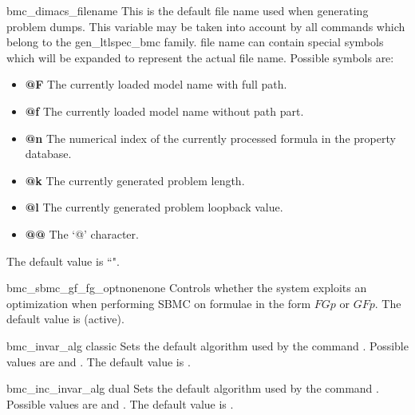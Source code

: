 \begin{nusmvVar} {bmc\_dimacs\_filename}{}{}
This is the default file name used when generating \dimacs problem
dumps. This variable may be taken into account by all commands which
belong to the gen\_ltlspec\_bmc family.  \dimacs file name can contain
special symbols which will be expanded to represent the actual file
name. Possible symbols are:

\begin{itemize}
\item {\bf @F}
The currently loaded model name with full path. 
\item {\bf @f}
The currently loaded model name without path part. 
\item {\bf @n}
The numerical index of the currently processed formula in the property
database.
\item {\bf @k} 
The currently generated problem length. 
\item {\bf @l}
The currently generated problem loopback value.   
\item {\bf @@}
The `@' character.   
\end{itemize}

The default value is ``".
\end{nusmvVar}

\begin{nusmvVar} {bmc\_sbmc\_gf\_fg\_opt}{none}{none}
Controls whether the system exploits an optimization when performing
SBMC on formulae in the form $F G p$ or $G F p$. The default value is
 (active).
\end{nusmvVar}








\label{bmc::dual}

\begin{nusmvVar} {bmc\_invar\_alg}
{}{classic}
Sets the default algorithm used by the command . 
Possible values are  and .
The default value is .
\end{nusmvVar}

\begin{nusmvVar} {bmc\_inc\_invar\_alg}
{}{dual}
Sets the default algorithm used by the command . 
Possible values are  and .
The default value is .
\end{nusmvVar}

